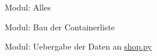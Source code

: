 
\begin{DoxyRefList}
\item[\label{todo__todo000002}%
\hypertarget{todo__todo000002}{}%
File \hyperlink{shop_8py}{shop.py} ]Modul\+: Alles  
\item[\label{todo__todo000003}%
\hypertarget{todo__todo000003}{}%
File \hyperlink{testinit_8py}{testinit.py} ]Modul\+: Bau der Containerliste 

Modul\+: Uebergabe der Daten an \hyperlink{shop_8py}{shop.\+py} 
\end{DoxyRefList}